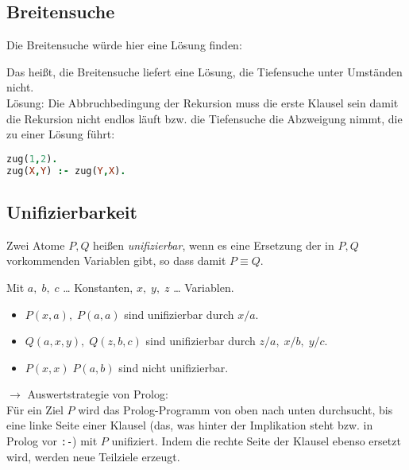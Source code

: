 \subsection{Breitensuche}
Die Breitensuche würde hier eine Lösung finden:
\begin{center}
\end{center}
Das heißt, die Breitensuche liefert eine Lösung, die Tiefensuche unter Umständen nicht.\bigskip\\
Lösung: Die Abbruchbedingung der Rekursion muss die erste Klausel sein damit die Rekursion nicht endlos läuft bzw. die Tiefensuche die Abzweigung nimmt, die zu einer Lösung führt:
\begin{lstlisting}[language=Prolog]
zug(1,2).
zug(X,Y) :- zug(Y,X).
\end{lstlisting}


\subsection{Unifizierbarkeit}
 Zwei Atome $P,Q$ heißen \emph{unifizierbar}, wenn es eine Ersetzung der in $P,Q$ vorkommenden Variablen gibt, so dass damit $P\equiv Q$.

 Mit $a,\; b,\; c$ … Konstanten, $x,\; y ,\; z$ … Variablen.
\begin{itemize}
\item $P(x,a),\; P(a,a)$ sind unifizierbar durch $x/a$.
\item $Q(a,x,y),\; Q(z,b,c)$ sind unifizierbar durch $z/a,\; x/b,\; y/c$.
\item $P(x,x)\; P(a,b)$ sind nicht unifizierbar.
\end{itemize}

$\to$ Auswertstrategie von Prolog:\\
Für ein Ziel $P$ wird das Prolog-Programm von oben nach unten durchsucht, bis eine linke Seite einer Klausel (das, was hinter der Implikation steht bzw. in Prolog vor \lstinline$:-$) mit $P$ unifiziert. Indem die rechte Seite der Klausel ebenso ersetzt wird, werden neue Teilziele erzeugt.

